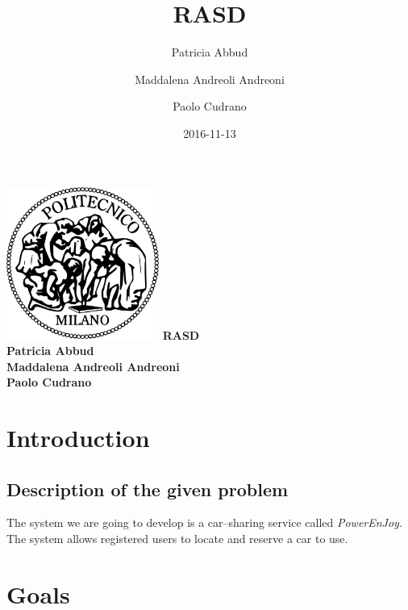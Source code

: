\documentclass{article}
\title{RASD}
\date{2016-11-13}
\author{
	Patricia Abbud
	\and
	Maddalena Andreoli Andreoni
	\and
	Paolo Cudrano
}
\begin{document}
	\begin{titlepage}
	    \centering
	    \includegraphics[width=5cm]{img/polimi_logo.png} %
	    \vfill
	    {\bfseries\Large
	        RASD\\
	        \vskip4cm
			Patricia Abbud\\
			Maddalena Andreoli Andreoni\\
	        Paolo Cudrano\\
	    }    
	    \vfill
	    \vfill
	\end{titlepage}

	\tableofcontents
	\newpage	
  
  \section{Introduction}
		\subsection{Description of the given problem}

The system we are going to develop is a car–sharing service called \textit{PowerEnJoy}. The system allows registered users to locate and reserve a car to use.

	\section{Goals}
	
		
	
\end{document}
